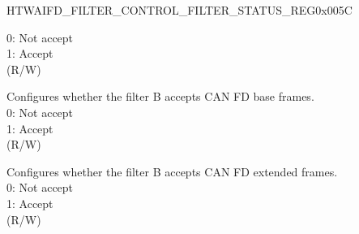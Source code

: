 \begin{register}{H}{TWAIFD\_FILTER\_CONTROL\_FILTER\_STATUS\_REG}{0x005C}
\begin{regdesc}
\begin{reglist}
0: Not accept\\
1: Accept\\(R/W)
\label{fielddesc:TWAIFDFBFB}\item [TWAIFD\_FBFB] Configures whether the filter B accepts CAN FD base frames.\\
0: Not accept\\
1: Accept\\(R/W)
\label{fielddesc:TWAIFDFBFE}\item [TWAIFD\_FBFE] Configures whether the filter B accepts CAN FD extended frames.\\
0: Not accept\\
1: Accept\\(R/W)

\item [Continued on the next page...]
\end{reglist}\end{regdesc}
\end{register}

